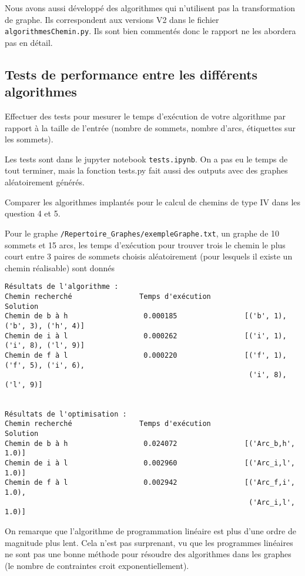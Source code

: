 Nous avons aussi développé des algorithmes qui n'utilisent pas la transformation
de graphe. Ils correspondent aux versions V2 dans le fichier
\verb|algorithmesChemin.py|. Ils sont bien commentés donc le rapport ne les
abordera pas en détail.

\subsection{Tests de performance entre les différents algorithmes}
\label{sec:tests}

\begin{question}
  Effectuer des tests pour mesurer le temps d'exécution de votre algorithme par
  rapport à la taille de l'entrée (nombre de sommets, nombre d'arcs, étiquettes
  sur les sommets).
\end{question}

\begin{reponse}
  Les tests sont dans le jupyter notebook \verb|tests.ipynb|. On a pas eu le
  temps de tout terminer, mais la fonction tests.py fait aussi des outputs avec
  des graphes aléatoirement générés.
\end{reponse}

\begin{question}
  Comparer les algorithmes implantés pour le calcul de chemins de type IV dans
  les question 4 et 5.
\end{question}

\begin{reponse}
  Pour le graphe \verb|/Repertoire_Graphes/exempleGraphe.txt|, un graphe de 10
  sommets et 15 arcs, les temps d'exécution pour trouver trois le chemin le plus
  court entre 3 paires de sommets choisis aléatoirement (pour lesquels il existe
  un chemin réalisable) sont donnés

\begin{verbatim}
Résultats de l'algorithme :
Chemin recherché                Temps d'exécution               Solution
Chemin de b à h                  0.000185                [('b', 1), ('b', 3), ('h', 4)]
Chemin de i à l                  0.000262                [('i', 1), ('i', 8), ('l', 9)]
Chemin de f à l                  0.000220                [('f', 1), ('f', 5), ('i', 6),
                                                          ('i', 8), ('l', 9)]


Résultats de l'optimisation :
Chemin recherché                Temps d'exécution               Solution
Chemin de b à h                  0.024072                [('Arc_b,h', 1.0)]
Chemin de i à l                  0.002960                [('Arc_i,l', 1.0)]
Chemin de f à l                  0.002942                [('Arc_f,i', 1.0),
                                                          ('Arc_i,l', 1.0)]
\end{verbatim}

  On remarque que l'algorithme de programmation linéaire est plus d'une ordre de
  magnitude plus lent. Cela n'est pas surprenant, vu que les programmes
  linéaires ne sont pas une bonne méthode pour résoudre des algorithmes dans les
  graphes (le nombre de contraintes croit exponentiellement).
\end{reponse}


